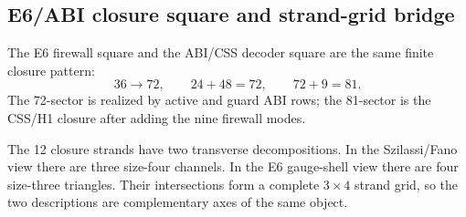 \subsection{E6/ABI closure square and strand-grid bridge}
\label{sec:bt1477-bt1479-e6-abi-grid}

The E6 firewall square and the ABI/CSS decoder square are the same finite closure pattern:
\[
36\to72,
\qquad
24+48=72,
\qquad
72+9=81.
\]
The 72-sector is realized by active and guard ABI rows; the 81-sector is the CSS/H1 closure after adding the nine firewall modes.

The 12 closure strands have two transverse decompositions.  In the Szilassi/Fano view there are three size-four channels.  In the E6 gauge-shell view there are four size-three triangles.  Their intersections form a complete \(3\times4\) strand grid, so the two descriptions are complementary axes of the same object.
